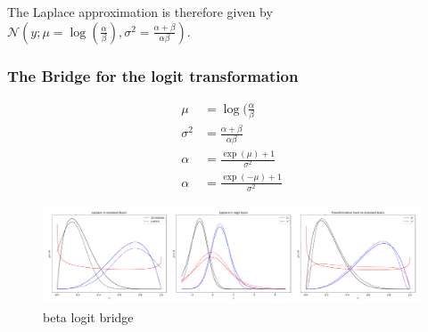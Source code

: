 The Laplace approximation is therefore given by $\mathcal{N}(y; \mu=\log(\frac{\alpha}{\beta}), \sigma^2 = \frac{\alpha + \beta}{\alpha \beta})$.

\subsubsection{The Bridge for the logit transformation}

\begin{subequations}
\begin{align}
	\mu &=\log(\frac{\alpha}{\beta} \\
	\sigma^2 &= \frac{\alpha + \beta}{\alpha \beta} \\
	\alpha &= \frac{\exp(\mu) + 1}{\sigma^2} \\
	\alpha &= \frac{\exp(-\mu) + 1}{\sigma^2} 
\end{align}
\end{subequations}

\begin{figure}[!htb]
	\centering
	\includegraphics[width=\textwidth]{figures/beta_logit_bridge.pdf}
	\caption{beta logit bridge}
	\label{fig:beta_logit_bridge}
\end{figure}